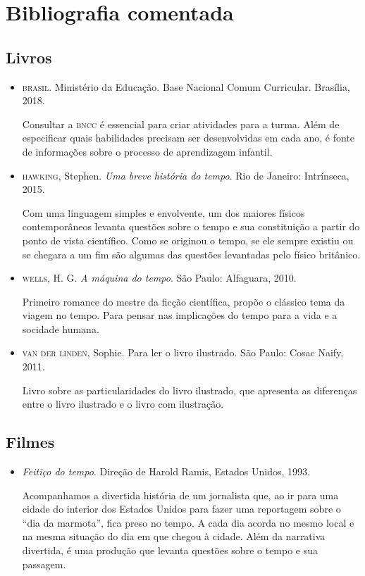 \documentclass[11pt]{extarticle}
\begin{document}
\section{Bibliografia comentada}

\subsection{Livros}

\begin{itemize}
\item \textsc{brasil}. Ministério da Educação. Base Nacional Comum Curricular. Brasília, 2018.

Consultar a \textsc{bncc} é essencial para criar atividades para a turma. Além de especificar 
quais habilidades precisam ser desenvolvidas em cada ano, é fonte de informações sobre 
o processo de aprendizagem infantil. 

\item \textsc{hawking}, Stephen. \textit{Uma breve história do tempo}. Rio de Janeiro: Intrínseca, 2015.

Com uma linguagem simples e envolvente, um dos maiores físicos contemporâneos levanta questões sobre o tempo e sua constituição a partir do ponto de vista científico. Como se originou o tempo, se ele sempre existiu ou se chegara a um fim são algumas das questões levantadas pelo físico britânico.

\item \textsc{wells}, H. G. \textit{A máquina do tempo}. São Paulo: Alfaguara, 2010.

Primeiro romance do mestre da ficção científica, propõe o clássico tema da viagem no tempo. Para pensar nas implicações do tempo para a vida e a socidade humana.

\item \textsc{van der linden}, Sophie. Para ler o livro ilustrado. São Paulo: Cosac Naify, 2011.

Livro sobre as particularidades do livro ilustrado, que apresenta as diferenças entre o livro ilustrado e o livro com ilustração. 
\end{itemize}

\subsection{Filmes}

\begin{itemize}

\item \textit{Feitiço do tempo}. Direção de Harold Ramis, Estados Unidos, 1993.

Acompanhamos a divertida história de um jornalista que, ao ir para uma cidade do interior dos Estados Unidos para fazer uma reportagem sobre o ``dia da marmota'', fica preso no tempo. A cada dia acorda no mesmo local e na mesma situação do dia em que chegou à cidade. Além da narrativa divertida, é uma produção que levanta questões sobre o tempo e sua passagem.
\end{itemize}
\end{document}
